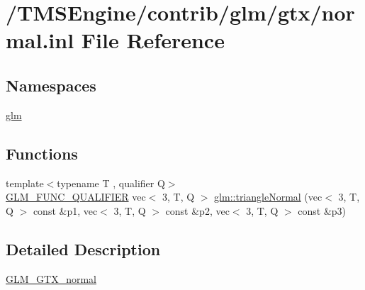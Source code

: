 \hypertarget{normal_8inl}{}\section{/\+T\+M\+S\+Engine/contrib/glm/gtx/normal.inl File Reference}
\label{normal_8inl}
\subsection*{Namespaces}
\begin{DoxyCompactItemize}
\item 
 \hyperlink{namespaceglm}{glm}
\end{DoxyCompactItemize}
\subsection*{Functions}
\begin{DoxyCompactItemize}
\item 
{\footnotesize template$<$typename T , qualifier Q$>$ }\\\hyperlink{setup_8hpp_a33fdea6f91c5f834105f7415e2a64407}{G\+L\+M\+\_\+\+F\+U\+N\+C\+\_\+\+Q\+U\+A\+L\+I\+F\+I\+ER} vec$<$ 3, T, Q $>$ \hyperlink{group__gtx__normal_gaff1cb5496925dfa7962df457772a7f35}{glm\+::triangle\+Normal} (vec$<$ 3, T, Q $>$ const \&p1, vec$<$ 3, T, Q $>$ const \&p2, vec$<$ 3, T, Q $>$ const \&p3)
\end{DoxyCompactItemize}


\subsection{Detailed Description}
\hyperlink{group__gtx__normal}{G\+L\+M\+\_\+\+G\+T\+X\+\_\+normal} 